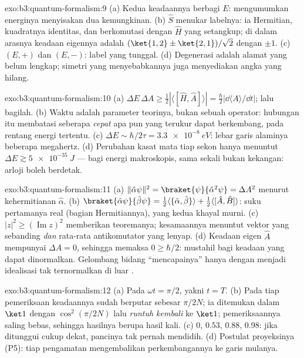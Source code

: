 \begin{solution}{exo:b3:quantum-formalism:9}
(a) Kedua keadaannya berbagi $E$: mengumumkan energinya menyisakan dua
kemungkinan. (b) $\hat S$ menukar labelnya: ia Hermitian, kuadratnya
identitas, dan berkomutasi dengan $\hat H$ yang setangkup; di dalam
arasnya keadaan eigennya adalah $(\ket{1,2} \pm \ket{2,1})/\sqrt2$ dengan
 $\pm1$. (c) $(E, +)$ dan $(E, -)$: label yang tunggal. (d)
Degenerasi adalah alamat yang belum lengkap; simetri yang menyebabkannya
juga menyediakan angka yang hilang.
\end{solution}

\begin{solution}{exo:b3:quantum-formalism:10}
(a) $\Delta E\,\Delta A \ge \tfrac12|\langle[\hat H, \hat
A]\rangle| = \tfrac\hbar2|\dd\langle A\rangle/\dd t|$; lalu bagilah. (b)
Waktu adalah parameter teorinya, bukan sebuah operator: hubungan itu
membatasi seberapa \emph{cepat} apa pun yang terukur dapat berkembang,
pada rentang energi tertentu. (c) $\Delta E \sim \hbar/2\tau = \qty{3.3e-8}{eV}$:
lebar garis alaminya beberapa megahertz. (d) Perubahan kasat mata tiap
sekon hanya menuntut $\Delta E \gtrsim \qty{5e-35}{J}$ --- bagi energi
makroskopis, sama sekali bukan kekangan: arloji boleh berdetak.
\end{solution}

\begin{solution}{exo:b3:quantum-formalism:11}
(a) $\|\hat\alpha\psi\|^2 = \braket{\psi}{\hat\alpha^2\psi} =
\Delta A^2$ menurut kehermitianan $\hat\alpha$. (b) $\braket{\hat\alpha
\psi}{\hat\beta\psi} = \tfrac12\langle\{\hat\alpha,
\hat\beta\}\rangle + \tfrac12\langle[\hat A, \hat B]\rangle$: suku
pertamanya real (bagian Hermitiannya), yang kedua khayal murni.
(c) $|z|^2 \ge (\operatorname{Im}z)^2$ memberikan teoremanya;
kesamaannya menuntut vektor yang sebanding \emph{dan} rata-rata
antikomutator yang lenyap. (d) Keadaan eigen $\hat A$ mempunyai $\Delta A = 0$,
sehingga memaksa $0 \ge \hbar/2$: mustahil bagi keadaan yang dapat
dinormalkan. Gelombang bidang ``mencapainya'' hanya dengan menjadi
idealisasi tak ternormalkan di luar .
\end{solution}

\begin{solution}{exo:b3:quantum-formalism:12}
(a) Pada $\omega t = \pi/2$, yakni $t = T$. (b) Pada tiap pemeriksaan
keadaannya sudah berputar sebesar $\pi/2N$; ia ditemukan dalam $\ket1$
dengan $\cos^2(\pi/2N)$ lalu \emph{runtuh kembali} ke $\ket1$;
pemeriksaannya saling bebas, sehingga hasilnya berupa hasil kali. (c)
$0$, $0.53$, $0.88$, $0.98$: jika ditunggui cukup dekat, pancinya tak
pernah mendidih. (d) Postulat proyeksinya (P5): tiap pengamatan
mengembalikan perkembangannya ke garis mulanya.
\end{solution}

